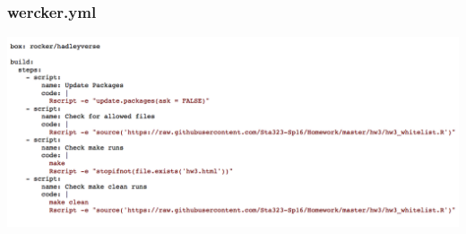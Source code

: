 \documentclass[12pt]{beamer}
\begin{document}

\begin{frame}
\frametitle{wercker.yml}

\hspace*{-8mm}
\includegraphics[width=1.15\textwidth]{imgs/wercker.yml.png}


\end{frame}

\end{document}
